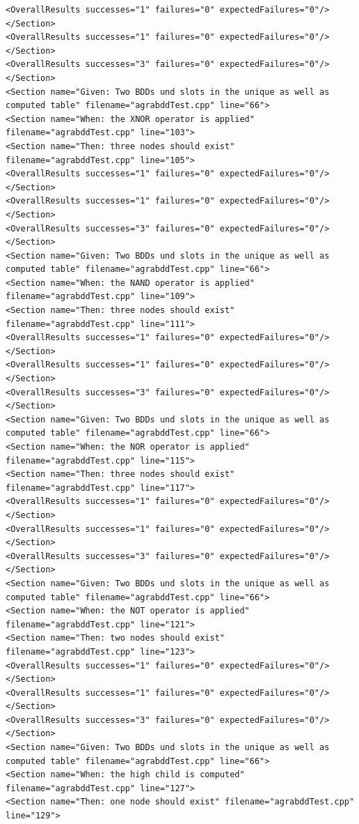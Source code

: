 \begin{verbatim}
<OverallResults successes="1" failures="0" expectedFailures="0"/>
</Section>
<OverallResults successes="1" failures="0" expectedFailures="0"/>
</Section>
<OverallResults successes="3" failures="0" expectedFailures="0"/>
</Section>
<Section name="Given: Two BDDs und slots in the unique as well as computed table" filename="agrabddTest.cpp" line="66">
<Section name="When: the XNOR operator is applied" filename="agrabddTest.cpp" line="103">
<Section name="Then: three nodes should exist" filename="agrabddTest.cpp" line="105">
<OverallResults successes="1" failures="0" expectedFailures="0"/>
</Section>
<OverallResults successes="1" failures="0" expectedFailures="0"/>
</Section>
<OverallResults successes="3" failures="0" expectedFailures="0"/>
</Section>
<Section name="Given: Two BDDs und slots in the unique as well as computed table" filename="agrabddTest.cpp" line="66">
<Section name="When: the NAND operator is applied" filename="agrabddTest.cpp" line="109">
<Section name="Then: three nodes should exist" filename="agrabddTest.cpp" line="111">
<OverallResults successes="1" failures="0" expectedFailures="0"/>
</Section>
<OverallResults successes="1" failures="0" expectedFailures="0"/>
</Section>
<OverallResults successes="3" failures="0" expectedFailures="0"/>
</Section>
<Section name="Given: Two BDDs und slots in the unique as well as computed table" filename="agrabddTest.cpp" line="66">
<Section name="When: the NOR operator is applied" filename="agrabddTest.cpp" line="115">
<Section name="Then: three nodes should exist" filename="agrabddTest.cpp" line="117">
<OverallResults successes="1" failures="0" expectedFailures="0"/>
</Section>
<OverallResults successes="1" failures="0" expectedFailures="0"/>
</Section>
<OverallResults successes="3" failures="0" expectedFailures="0"/>
</Section>
<Section name="Given: Two BDDs und slots in the unique as well as computed table" filename="agrabddTest.cpp" line="66">
<Section name="When: the NOT operator is applied" filename="agrabddTest.cpp" line="121">
<Section name="Then: two nodes should exist" filename="agrabddTest.cpp" line="123">
<OverallResults successes="1" failures="0" expectedFailures="0"/>
</Section>
<OverallResults successes="1" failures="0" expectedFailures="0"/>
</Section>
<OverallResults successes="3" failures="0" expectedFailures="0"/>
</Section>
<Section name="Given: Two BDDs und slots in the unique as well as computed table" filename="agrabddTest.cpp" line="66">
<Section name="When: the high child is computed" filename="agrabddTest.cpp" line="127">
<Section name="Then: one node should exist" filename="agrabddTest.cpp" line="129">

\end{verbatim}
